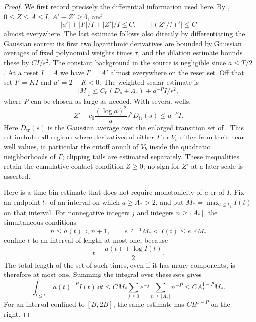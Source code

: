 \begin{proof}
We first record precisely the differential information used here.
By , $0\le Z\le A\le I$,
$A'-Z'\ge0$, and
\begin{equation}\label{pk:regular-path}
 |a'|+|I'|/I+|Z'|/I\le C,\qquad
 \left|(Z'/I)'\right|\le C
\end{equation}
almost everywhere.  The last estimate follows also directly by
differentiating the Gaussian source: its first two logarithmic
derivatives are bounded by Gaussian averages of fixed polynomial
weights times $\tau$, and the dilation estimate bounds these by
$CI/s^2$.  The constant background in the source is negligible since
$a\le T/2$.  At a reset $I=A$ we have $I'=A'$ almost everywhere on
the reset set.  Off that set $I'=KI$ and $a'=2-K<0$.
The weighted scalar estimate is
\begin{equation}\label{pk:weighted-scalar}
 |M|_s\le C_0(D_s+\Lambda_s)+a^{-P}I/s^2,
\end{equation}
where $P$ can be chosen as large as needed.  With several wells,
\begin{equation}\label{pk:source-transition}
 Z'+c_0\frac{(\log a)^2}{a}s^2D_{\mathrm{tr}}(s)
 \le a^{-P}I.
\end{equation}
Here $D_{\mathrm{tr}}(s)$ is the Gaussian average over the
enlarged transition set of .  This set
includes all regions where derivatives of either $\Gamma$
or $V_b$ differ from their near-well values, in particular
the cutoff annuli of $V_b$ inside the quadratic neighborhoods
of $\Gamma$; clipping tails are estimated separately.
These inequalities retain the cumulative contact condition $Z\ge0$;
no sign for $Z'$ at a later scale is asserted.

Here is a time-bin estimate that does not require monotonicity of
$a$ or of $I$.  Fix an endpoint $t_1$ of an interval on which
$a\ge A_*>2$, and put $M_* =\max_{t\le t_1}I(t)$ on that interval.
For nonnegative integers $j$ and integers $n\ge\lfloor A_*\rfloor$,
the simultaneous conditions
\[
 n\le a(t)<n+1,\qquad e^{-j-1}M_*<I(t)\le e^{-j}M_*
\]
confine $t$ to an interval of length at most one, because
\begin{equation}\label{pk:time-identity}
 t=\frac{a(t)+\log I(t)}2.
\end{equation}
The total length of the set of such times, even if it has many
components, is therefore at most one.  Summing the integral over
these sets gives
\begin{equation}\label{pk:time-bin}
 \int_{t\le t_1}a(t)^{-P}I(t)\,\dd t
 \le CM_*\sum_{j\ge0}e^{-j}
       \sum_{n\ge\lfloor A_*\rfloor}n^{-P}
 \le C A_*^{1-P}M_*.
\end{equation}
For an interval confined to $[B,2B]$, the same estimate has
$CB^{1-P}$ on the right.


\end{proof}
